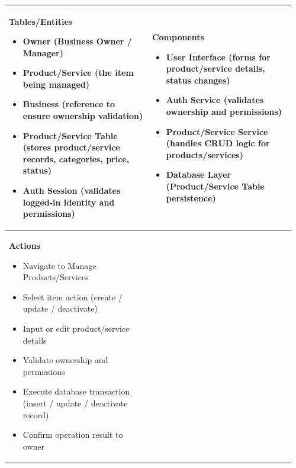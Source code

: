 \documentclass[]{VUMIFTemplateClass}
\newenvironment{mpitemlist}[1][\linewidth]{%
    \begin{minipage}[t]{#1}%
        \setlength{\leftmargini}{12pt}%
        \begin{itemize}%
            \setlength{\itemsep}{1pt}%
            \setlength{\parskip}{0pt}%
            \setlength{\parsep}{0pt}%
}{%
        \end{itemize}%
    \end{minipage}\newline
}
\begin{document}
\begin{center}
\setlength{\tabcolsep}{8pt}
\begin{tabular}{|p{0.48\linewidth}|p{0.48\linewidth}|}
\hline
\textbf{Tables/Entities} \newline
\begin{mpitemlist}
\item Owner (Business Owner / Manager)
\item Product/Service (the item being managed)
\item Business (reference to ensure ownership validation)
\item Product/Service Table (stores product/service records, categories, price, status)
\item Auth Session (validates logged-in identity and permissions)
\end{mpitemlist}
&
\textbf{Components} \newline
\begin{mpitemlist}
\item User Interface (forms for product/service details, status changes)
\item Auth Service (validates ownership and permissions)
\item Product/Service Service (handles CRUD logic for products/services)
\item Database Layer (Product/Service Table persistence)
\end{mpitemlist}
\\ \hline
\textbf{Actions} \newline
\begin{mpitemlist}
\item Navigate to Manage Products/Services
\item Select item action (create / update / deactivate)
\item Input or edit product/service details
\item Validate ownership and permissions
\item Execute database transaction (insert / update / deactivate record)
\item Confirm operation result to owner
\end{mpitemlist}
&

\\ \hline
\end{tabular}
\end{center}
\end{document}
